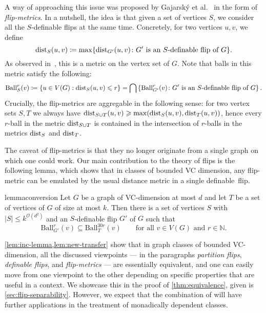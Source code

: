 \documentclass[a4paper,UKenglish,cleveref, autoref, thm-restate]{lipics-v2021}
\newcommand{\N}[0]{\mathrm{\mathbb{N}}}
\renewcommand{\subset}{\subseteq}
\newcommand{\dist}{\textnormal{dist}}
\renewcommand{\le}{\leqslant}
\renewcommand{\leq}{\le}
\renewcommand{\ge}{\geqslant}
\renewcommand{\geq}{\ge}
\newcommand{\Ball}{\mathrm{Ball}}
\newcommand{\Oh}{\mathcal{O}}
\begin{document}
A way of approaching this issue was proposed by Gajarsk\'y et al.~\cite{flipper-game} in the form of {\em{flip-metrics}}. In a nutshell, the idea is that given a set of vertices $S$, we consider all the $S$-definable flips at the same time. Concretely,  for two vertices $u,v$, we define
\[\dist_S(u,v)\coloneqq \max\{\dist_{G'}(u,v)\colon G'\textrm{ is an $S$-definable flip of $G$}\}.\]
As observed in~\cite{flipper-game}, this is a metric on the vertex set of $G$. Note that balls in this metric satisfy the following:
\[\Ball_S^r(v)
\coloneqq \{ u \in V(G) : \dist_S(u,v) \leq r \}
=\bigcap \left\{\Ball_{G'}^r(v)\colon G'\textrm{ is an $S$-definable flip of $G$}\right\}.\]
Crucially, the flip-metrics are aggregable in the following sense: for two vertex sets $S,T$ we always have $\dist_{S\cup T}(u,v)\geq \max(\dist_S(u,v),\dist_T(u,v))$, hence every $r$-ball in the metric $\dist_{S\cup T}$ is contained in the intersection of $r$-balls in the metrics $\dist_S$ and $\dist_T$.

The caveat of flip-metrics is that they no longer originate from a single graph on which one could work. Our main contribution to the theory of flips is the following lemma, which shows that in classes of bounded VC dimension, any flip-metric can be emulated by the usual distance metric in a single definable~flip.

\begin{restatable}{lemma}{conversion}\label{lem:new-transfer}
  Let $G$ be a graph of VC-dimension at most $d$ and let $T$ be a set of vertices of $G$ of size at most $k$. Then there is a set of vertices $S$ with $|S|\leq k^{\Oh(d^2)}$ and an $S$-definable flip $G'$ of $G$ such that
    \[\Ball^r_{G'}(v)\subset \Ball^{30r}_T(v)\qquad\text{for all $v\in V(G)$ and $r \in \N$.}\]
\end{restatable}



\cref{lem:inc-lemma,lem:new-transfer} show that in graph classes of bounded VC-dimension, all the discussed viewpoints --- in the paragraphs \emph{partition flips}, \emph{definable flips}, and \emph{flip-metrics} --- are essentially equivalent, and one can easily move from one viewpoint to the other depending on specific properties that are useful in a context. We showcase this in the proof of \cref{thm:equivalence}, given is \cref{sec:flip-separability}. However, we expect that the combination of  will have further applications in the treatment of monadically dependent classes.
\end{document}
